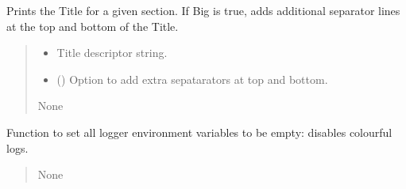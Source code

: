 \documentclass[letterpaper,10pt,english]{sphinxmanual}
\begin{document}
\begin{fulllineitems}
\label{\detokenize{api/killMS.Other:killMS.Other.ModColor.Title}}
\pysigstartsignatures
{}
\pysigstopsignatures
\sphinxAtStartPar
Prints the Title for a given section. If Big is true, adds additional separator
lines at the top and bottom of the Title.
\begin{quote}\begin{description}
\begin{itemize}
\item {} 
\sphinxAtStartPar
{} \textendash{} Title descriptor string.

\item {} 
\sphinxAtStartPar
{} () \textendash{} Option to add extra sepatarators at top and bottom.

\end{itemize}

\sphinxAtStartPar
None

\end{description}\end{quote}

\end{fulllineitems}


\begin{fulllineitems}
\label{\detokenize{api/killMS.Other:killMS.Other.ModColor.disable}}
\pysigstartsignatures
{}
\pysigstopsignatures
\sphinxAtStartPar
Function to set all logger environment variables to be empty: disables colourful logs.
\begin{quote}\begin{description}
\sphinxAtStartPar
None

\end{description}\end{quote}

\end{fulllineitems}
\end{document}
